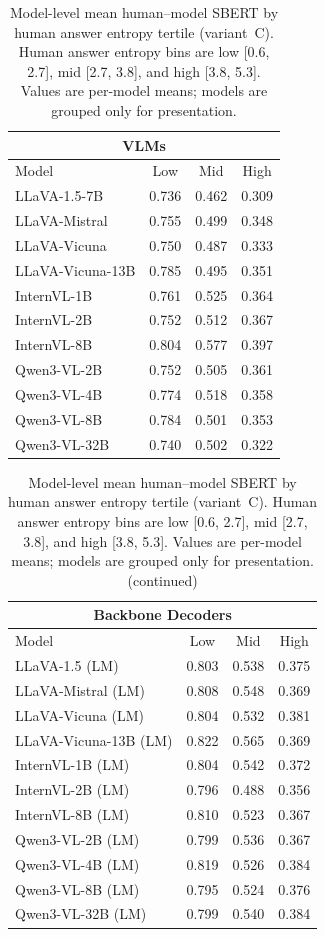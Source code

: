 \begin{table}[t]
\centering
\scriptsize
\caption{Model-level mean human--model SBERT by human answer entropy tertile (variant~C). Human answer entropy bins are low [0.6, 2.7], mid [2.7, 3.8], and high [3.8, 5.3]. Values are per-model means; models are grouped only for presentation.}
\label{tab:entropy_stratified}
\begin{tabular}{lccc}
\toprule
\multicolumn{4}{c}{\textbf{VLMs}} \\
\midrule
Model & Low & Mid & High \\
\midrule
LLaVA-1.5-7B & 0.736 & 0.462 & 0.309 \\
LLaVA-Mistral & 0.755 & 0.499 & 0.348 \\
LLaVA-Vicuna & 0.750 & 0.487 & 0.333 \\
LLaVA-Vicuna-13B & 0.785 & 0.495 & 0.351 \\
InternVL-1B & 0.761 & 0.525 & 0.364 \\
InternVL-2B & 0.752 & 0.512 & 0.367 \\
InternVL-8B & 0.804 & 0.577 & 0.397 \\
Qwen3-VL-2B & 0.752 & 0.505 & 0.361 \\
Qwen3-VL-4B & 0.774 & 0.518 & 0.358 \\
Qwen3-VL-8B & 0.784 & 0.501 & 0.353 \\
Qwen3-VL-32B & 0.740 & 0.502 & 0.322 \\
\bottomrule
\end{tabular}
\end{table}

\begin{table}[t]
\centering
\scriptsize
\caption{Model-level mean human--model SBERT by human answer entropy tertile (variant~C). Human answer entropy bins are low [0.6, 2.7], mid [2.7, 3.8], and high [3.8, 5.3]. Values are per-model means; models are grouped only for presentation. (continued)}
\begin{tabular}{lccc}
\toprule
\multicolumn{4}{c}{\textbf{Backbone Decoders}} \\
\midrule
Model & Low & Mid & High \\
\midrule
LLaVA-1.5 (LM) & 0.803 & 0.538 & 0.375 \\
LLaVA-Mistral (LM) & 0.808 & 0.548 & 0.369 \\
LLaVA-Vicuna (LM) & 0.804 & 0.532 & 0.381 \\
LLaVA-Vicuna-13B (LM) & 0.822 & 0.565 & 0.369 \\
InternVL-1B (LM) & 0.804 & 0.542 & 0.372 \\
InternVL-2B (LM) & 0.796 & 0.488 & 0.356 \\
InternVL-8B (LM) & 0.810 & 0.523 & 0.367 \\
Qwen3-VL-2B (LM) & 0.799 & 0.536 & 0.367 \\
Qwen3-VL-4B (LM) & 0.819 & 0.526 & 0.384 \\
Qwen3-VL-8B (LM) & 0.795 & 0.524 & 0.376 \\
Qwen3-VL-32B (LM) & 0.799 & 0.540 & 0.384 \\
\bottomrule
\end{tabular}
\end{table}

